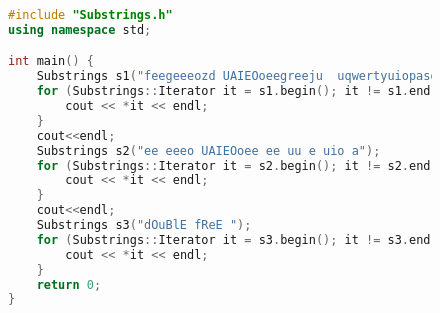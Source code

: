 \documentclass[a4paper, 14pt]{extarticle}
\begin{document}
\begin{figure}[!htb]
\begin{lstlisting}[language={c++},caption={main.cpp},label={lst:code1}]
#include "Substrings.h"
using namespace std;

int main() {
    Substrings s1("feegeeeozd UAIEOoeegreeju  uqwertyuiopasdfghjklzxcvbnm");
    for (Substrings::Iterator it = s1.begin(); it != s1.end(); ++it) {
        cout << *it << endl;
    }
    cout<<endl;
    Substrings s2("ee eeeo UAIEOoee ee uu e uio a");
    for (Substrings::Iterator it = s2.begin(); it != s2.end(); ++it) {
        cout << *it << endl;
    }
    cout<<endl;
    Substrings s3("dOuBlE fReE ");
    for (Substrings::Iterator it = s3.begin(); it != s3.end(); ++it) {
        cout << *it << endl;
    }
    return 0;
}
\end{lstlisting}
\end{figure}
\end{document}

